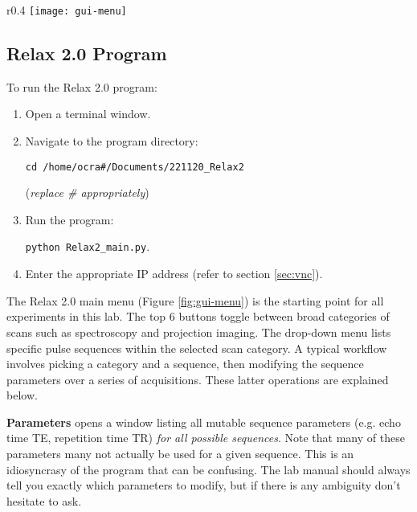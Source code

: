 \begin{wrapfigure}{r}{0.4\textwidth}%
    \centering
    \texttt{[image: gui-menu]}
    \captionsetup{width=.36\textwidth}
    \caption{\label{fig:gui-menu}Relax 2.0 main menu.}
\end{wrapfigure}

\subsection{Relax 2.0 Program} \label{sec:relax-program}

To run the Relax 2.0 program:

\begin{enumerate}
    \item   Open a terminal window.
    \item   Navigate to the program directory:
    
    \texttt{cd /home/ocra\#/Documents/221120\_Relax2}
    
    (\emph{replace \# appropriately})

    \item   Run the program:
    
    \texttt{python Relax2\_main.py}.

    \item   Enter the appropriate IP address (refer to section \ref{sec:vnc}).
    
\end{enumerate}

The Relax 2.0 main menu (Figure \ref{fig:gui-menu}) is the starting point for all experiments in this lab. The top 6 buttons toggle between broad categories of scans such as spectroscopy and projection imaging. The drop-down menu lists specific pulse sequences within the selected scan category. A typical workflow involves picking a category and a sequence, then modifying the sequence parameters over a series of acquisitions. These latter operations are explained below.

\textbf{Parameters} opens a window listing all mutable sequence parameters (e.g. echo time TE, repetition time TR) \emph{for all possible sequences}. Note that many of these parameters many not actually be used for a given sequence. This is an idiosyncrasy of the program that can be confusing. The lab manual should always tell you exactly which parameters to modify, but if there is any ambiguity don't hesitate to ask.

